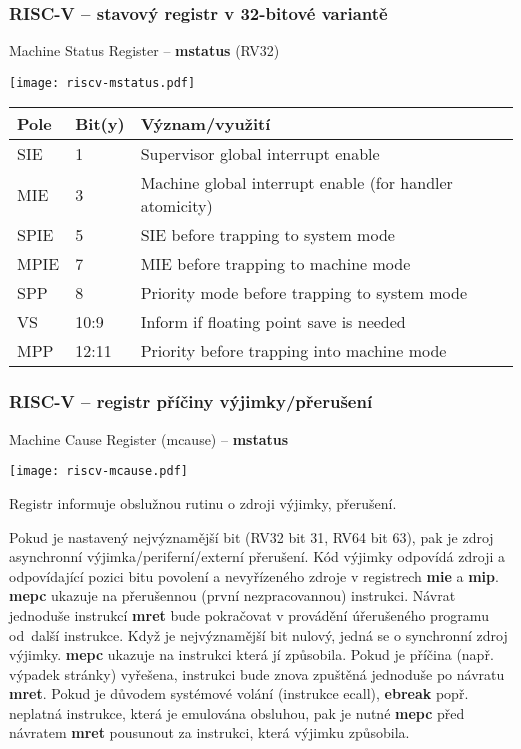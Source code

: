 \documentclass{beamer}
\begin{document}
\begin{frame}
\frametitle{RISC-V -- stavový registr v 32-bitové variantě}

Machine Status Register -- \textbf{mstatus} (RV32)

\begin{center}
  \texttt{[image: riscv-mstatus.pdf]}
\end{center}

\begin{tabular}{|l|l|l|}  \hline
Pole & Bit(y) & Význam/využití \\\hline
SIE & 1 & Supervisor global interrupt enable \\\hline
MIE & 3 & Machine global interrupt enable (for handler atomicity) \\\hline
SPIE & 5 & SIE before trapping to system mode \\\hline
MPIE & 7 & MIE before trapping to machine mode \\\hline
SPP & 8 & Priority mode before trapping to system mode \\\hline
VS & 10:9 & Inform if floating point save is needed \\\hline
MPP & 12:11 & Priority before trapping into machine mode \\\hline
\end{tabular}
\end{frame}

\begin{frame}
\frametitle{RISC-V -- registr příčiny výjimky/přerušení}

Machine Cause Register (mcause) -- \textbf{mstatus}

\begin{center}
  \texttt{[image: riscv-mcause.pdf]}
\end{center}

\small
Registr informuje obslužnou rutinu o zdroji výjimky, přerušení.

Pokud je nastavený nejvýznamější bit (RV32 bit 31, RV64 bit 63), pak je zdroj
asynchronní výjimka/periferní/externí přerušení. Kód výjimky odpovídá
zdroji a odpovídající pozici bitu povolení a nevyřízeného zdroje v registrech
\textbf{mie} a \textbf{mip}. \textbf{mepc} ukazuje na přerušennou (první nezpracovannou)
instrukci. Návrat jednoduše instrukcí \textbf{mret} bude pokračovat v provádění úřerušeného
programu od~další instrukce. Když je nejvýznamější bit nulový, jedná se o synchronní zdroj výjimky.
\textbf{mepc} ukazuje na instrukci která jí způsobila. Pokud je příčina
(např. výpadek stránky) vyřešena, instrukci bude znova zpuštěná jednoduše
po návratu \textbf{mret}. Pokud je důvodem systémové volání (instrukce ecall), \textbf{ebreak} popř.
neplatná instrukce, která je emulována obsluhou, pak je nutné \textbf{mepc} před návratem \textbf{mret}
pousunout za instrukci, která výjimku způsobila.


\end{frame}
\end{document}
